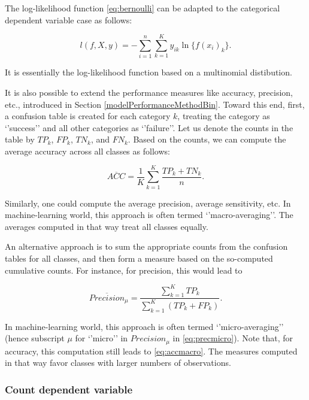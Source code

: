 \documentclass[12pt,]{krantz}
\begin{document}
The log-likelihood function \eqref{eq:bernoulli} can be adapted to the categorical dependent variable case as follows:

\begin{equation}
l(f, X ,y) =  -\sum_{i=1}^{n}\sum_{k=1}^{K} y_{ik} \ln\{f(x_i)_k\}.
\label{eq:multinom}
\end{equation}

It is essentially the log-likelihood function based on a multinomial distibution.

It is also possible to extend the performance measures like accuracy, precision, etc., introduced in Section \ref{modelPerformanceMethodBin}. Toward this end, first, a confusion table is created for each category \(k\), treating the category as `'success'' and all other categories as `'failure''. Let us denote the counts in the table by \(TP_k\), \(FP_k\), \(TN_k\), and \(FN_k\). Based on the counts, we can compute the average accuracy across all classes as follows:

\begin{equation}
\overline{ACC} = \frac{1}{K}\sum_{k=1}^K\frac{TP_k+TN_k}{n}.
\label{eq:accmacro}
\end{equation}

Similarly, one could compute the average precision, average sensitivity, etc. In machine-learning world, this approach is often termed `'macro-averaging''. The averages computed in that way treat all classes equally.

An alternative approach is to sum the appropriate counts from the confusion tables for all classes, and then form a measure based on the so-computed cumulative counts. For instance, for precision, this would lead to

\begin{equation}
\overline{Precision}_{\mu} = \frac{\sum_{k=1}^K TP_k}{\sum_{k=1}^K (TP_k+FP_k)}.
\label{eq:precmicro}
\end{equation}

In machine-learning world, this approach is often termed `'micro-averaging'' (hence subscript \(\mu\) for `'micro'' in \(Precision_{\mu}\) in \eqref{eq:precmicro}). Note that, for accuracy, this computation still leads to \eqref{eq:accmacro}. The measures computed in that way favor classes with larger numbers of observations.

\hypertarget{modelPerformanceMethodCount}{%
\subsubsection{Count dependent variable}\label{modelPerformanceMethodCount}}
\end{document}
